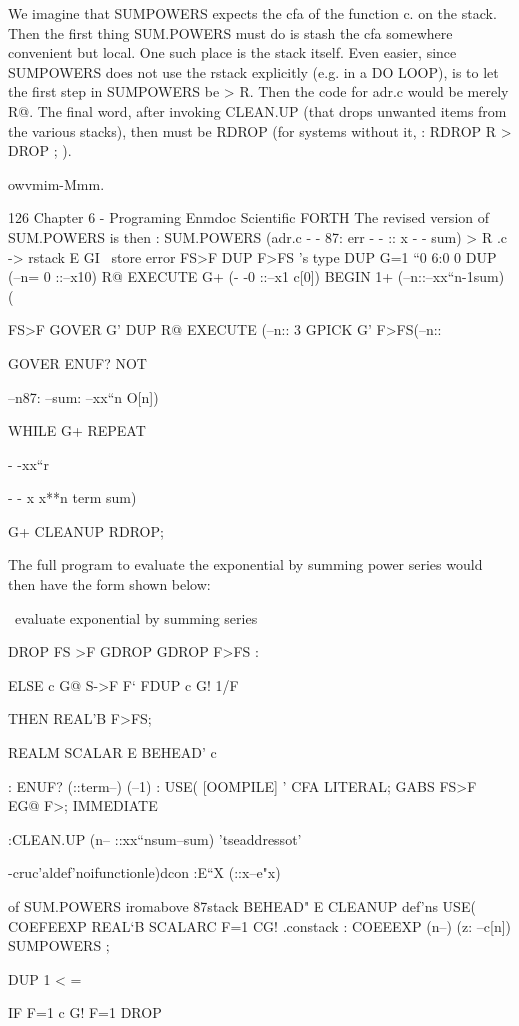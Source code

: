 {We imagine that SUMPOWERS expects the cfa of the function
c. on the stack. Then the first thing SUM.POWERS must do is
stash the cfa somewhere convenient but local. One such place is
the stack itself. Even easier, since SUMPOWERS does not use
the rstack explicitly (e.g. in a DO LOOP), is to let the first step
in SUMPOWERS be > R. Then the code for adr.c would be
merely R@. The final word, after invoking CLEAN.UP (that
drops unwanted items from the various stacks), then must be
RDROP (for systems without it, : RDROP R > DROP ; ).

owvmim-Mmm.

126 Chapter 6 - Programing Enmdoc Scientific FORTH
The revised version of SUM.POWERS is then
: SUM.POWERS (adr.c - - 87: err - - :: x - - sum)
> R \adr.c -> rstack
E GI \ store error
FS>F DUP F>FS \getx's type
DUP G=1 \x“0
6:0 0 DUP (--n= 0 ::--x10)
R@ EXECUTE G+ (- -0 ::--x1 c[0])
BEGIN 1+ (--n::--xx“n-1sum)
(

FS>F GOVER G'
DUP R@ EXECUTE (--n::
3 GPICK G' F>FS(--n::

GOVER
ENUF? NOT

--n87: --sum:
--xx“n O[n])

WHILE G+ REPEAT

- -xx“r

- - x x**n term sum)

G+ CLEANUP RDROP;

The full program to evaluate the exponential by summing power
series would then have the form shown below:

 

\ evaluate exponential by summing series

DROP FS >F
GDROP GDROP F>FS :

ELSE c G@ S->F
F‘ FDUP c G! 1/F


THEN REAL’B F>FS;

REALM SCALAR E BEHEAD' c \hidethisvariahie

: ENUF? (::term--) (--1) : USE( [OOMPILE] ' CFA LITERAL;
GABS FS>F EG@ F>; IMMEDIATE

:CLEAN.UP (n-- ::xx“nsum--sum) \thlsmeam'tseaddressot'

\--cruc'aldef'noifunctionle)dcon
:E“X (::x--e"x) %

 of SUM.POWERS iromabove \erroron87stack
BEHEAD" E CLEANUP \hidethese def'ns USE( COEFEEXP
REAL‘B SCALARC F=1 CG! \adr.constack
: COEEEXP (n--) (z: --c[n]) SUMPOWERS ;

DUP 1 < =

IF F=1 c G! F=1 DROP

}

